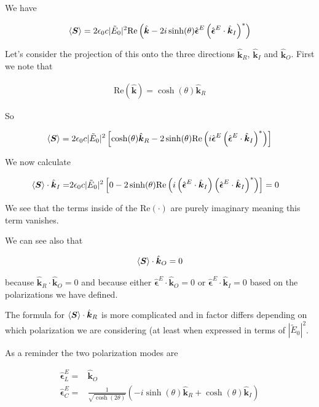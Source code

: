 \documentclass[12pt]{article}
\newcommand{\ep}{\epsilon}
\renewcommand{\vec}[1]{\boldsymbol{#1}}
\newcommand{\unitvec}[1]{\hat{\boldsymbol{#1}}}
\begin{document}
We have

\begin{align}
\Braket{\vec{S}} = 2\ep_0 c|\tilde{E}_0|^2\text{Re}\left(\unitvec{k} -2i \sinh(\theta) \unitvec{\ep}^E\left(\unitvec{\ep}^E\cdot\unitvec{k}_I\right)^*\right)
\end{align}

Let's consider the projection of this onto the three directions $\unitvec{k}_R$, $\unitvec{k}_I$ and $\unitvec{k}_O$. 
First we note that

\begin{align}
\text{Re}\left(\unitvec{k}\right) = \cosh(\theta)\unitvec{k}_R
\end{align}

So

\begin{align}
\Braket{\vec{S}} = 2\ep_0 c|\tilde{E}_0|^2\left[\cosh(\theta)\unitvec{k}_R - 2 \sinh(\theta)\text{Re}\left(i\unitvec{\ep}^E\left(\unitvec{\ep}^E\cdot\unitvec{k}_I\right)^*\right)\right]
\end{align}

We now calculate

\begin{align}
\Braket{\vec{S}}\cdot \unitvec{k}_I =& 2\ep_0c|\tilde{E}_0|^2 \left[0 - 2\sinh(\theta)\text{Re}\left(i\left(\unitvec{\ep}^E\cdot\unitvec{k}_I\right)\left(\unitvec{\ep}^E\cdot\unitvec{k}_I\right)^*\right)\right] =0 
\end{align}

We see that the terms inside of the $\text{Re}(\cdot)$ are purely imaginary meaning this term vanishes.

We can see also that

\begin{align}
\Braket{\vec{S}}\cdot\unitvec{k}_O = 0
\end{align}

because $\unitvec{k}_R\cdot\unitvec{k}_O=0$ and because either $\unitvec{\ep}^E\cdot\unitvec{k}_O = 0$ or $\unitvec{\ep}^E\cdot\unitvec{k}_I=0$ based on the polarizations we have defined.

The formula for $\Braket{\vec{S}}\cdot\unitvec{k}_R$ is more complicated and in factor differs depending on which polarization we are considering (at least when expressed in terms of $|\tilde{E}_0|^2$.

As a reminder the two polarization modes are

\begin{align}
\unitvec{\ep}^E_L =& \unitvec{k}_O\\
\unitvec{\ep}^E_C =& \frac{1}{\sqrt{\cosh(2\theta)}}\left(-i\sinh(\theta)\unitvec{k}_R + \cosh(\theta)\unitvec{k}_I\right)
\end{align}
\end{document}
